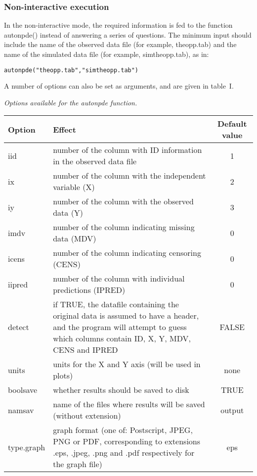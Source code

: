 \subsubsection{Non-interactive execution}

\hskip 18pt In the non-interactive mode, the required information is fed to the
function {\sf autonpde()} instead of answering a series of questions. The
minimum input should include the name of the observed data file (for example,
{\sf theopp.tab}) and the name of the simulated data file (for example, {\sf
simtheopp.tab}), as in:
\begin{verbatim}
autonpde("theopp.tab","simtheopp.tab")
\end{verbatim}
A number of options can also be set as arguments, and are given in table~I.
\begin{table}[!h]
 {\itshape Options available for the autonpde function.}
\begin{center}
\begin{tabular} {l p{8cm} c}
\hline \textbf{Option} & \textbf{Effect} & \textbf{Default value} \\
\hline
iid & number of the column with ID information in the observed data file & 1 \\
ix & number of the column with the independent variable (X) & 2 \\
iy & number of the column with the observed data (Y) & 3 \\
imdv & number of the column indicating missing data (MDV) & 0 \\
icens & number of the column indicating censoring (CENS) & 0 \\
iipred & number of the column with individual predictions (IPRED) & 0 \\
detect & if TRUE, the datafile containing the original data is assumed to have a header, and the program will attempt to guess which columns contain ID, X, Y, MDV, CENS and IPRED & FALSE \\
units & units for the X and Y axis (will be used in plots) & none \\
boolsave & whether results should be saved to disk & TRUE \\
namsav & name of the files where results will be saved (without extension) & output\\
type.graph & graph format (one of: Postscript, JPEG, PNG or PDF,
corresponding to extensions .eps, .jpeg, .png and .pdf respectively for the
graph file) & eps \\

\end{tabular}
\end{center}
\end{table}
